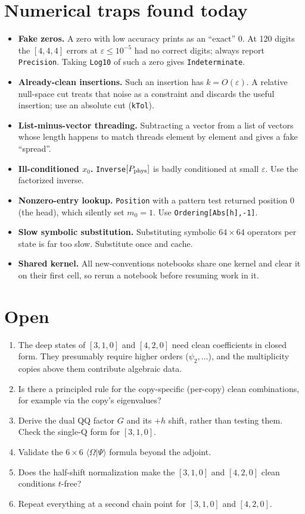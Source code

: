 \documentclass[11pt]{article}
\newcommand{\Om}{\Omega}
\newcommand{\eps}{\varepsilon}
\begin{document}
\section{Numerical traps found today}
\begin{itemize}
\item \textbf{Fake zeros.} A zero with low accuracy prints as an ``exact'' 0. At 120 digits the $[4,4,4]$ errors at $\eps\le10^{-5}$ had no correct digits; always report \texttt{Precision}. Taking \texttt{Log10} of such a zero gives \texttt{Indeterminate}.
\item \textbf{Already-clean insertions.} Such an insertion has $k=O(\eps)$. A relative null-space cut treats that noise as a constraint and discards the useful insertion; use an absolute cut (\texttt{kTol}).
\item \textbf{List-minus-vector threading.} Subtracting a vector from a list of vectors whose length happens to match threads element by element and gives a fake ``spread''.
\item \textbf{Ill-conditioned $x_0$.} \texttt{Inverse}$[P_{\rm phys}]$ is badly conditioned at small $\eps$. Use the factorized inverse.
\item \textbf{Nonzero-entry lookup.} \texttt{Position} with a pattern test returned position 0 (the head), which silently set $m_0=1$. Use \texttt{Ordering[Abs[h],-1]}.
\item \textbf{Slow symbolic substitution.} Substituting symbolic $64\times64$ operators per state is far too slow. Substitute once and cache.
\item \textbf{Shared kernel.} All new-conventions notebooks share one kernel and clear it on their first cell, so rerun a notebook before resuming work in it.
\end{itemize}

\section{Open}
\begin{enumerate}
\item The deep states of $[3,1,0]$ and $[4,2,0]$ need clean coefficients in closed form. They presumably require higher orders ($\psi_2,\dots$), and the multiplicity copies above them contribute algebraic data.
\item Is there a principled rule for the copy-specific (per-copy) clean combinations, for example via the copy's eigenvalues?
\item Derive the dual QQ factor $G$ and its $+h$ shift, rather than testing them. Check the single-Q form for $[3,1,0]$.
\item Validate the $6\times6$ $\langle\Om|\Psi\rangle$ formula beyond the adjoint.
\item Does the half-shift normalization make the $[3,1,0]$ and $[4,2,0]$ clean conditions $t$-free?
\item Repeat everything at a second chain point for $[3,1,0]$ and $[4,2,0]$.
\end{enumerate}
\end{document}
